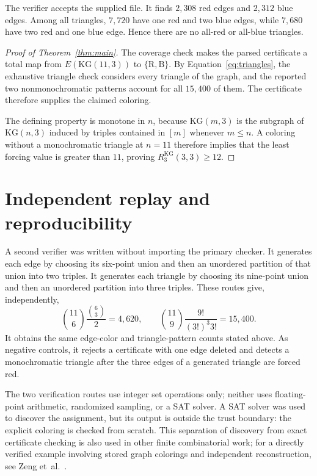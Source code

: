 \documentclass[11pt]{article}
\newcommand{\KG}{\mathrm{KG}}
\newcommand{\KGR}{R^{\mathrm{KG}}_{3}(3,3)}
\begin{document}
The verifier accepts the supplied file.  It finds $2{,}308$ red edges and
$2{,}312$ blue edges.  Among all triangles, $7{,}720$ have one red and two
blue edges, while $7{,}680$ have two red and one blue edge.  Hence there are
no all-red or all-blue triangles.

\begin{proof}[Proof of Theorem~\ref{thm:main}]
The coverage check makes the parsed certificate a total map from
$E(\KG(11,3))$ to $\{\mathrm{R},\mathrm{B}\}$.  By
Equation~\eqref{eq:triangles}, the exhaustive triangle check considers every
triangle of the graph, and the reported two nonmonochromatic patterns
account for all $15{,}400$ of them.  The certificate therefore supplies the
claimed coloring.

The defining property is monotone in $n$, because $\KG(m,3)$ is the
subgraph of $\KG(n,3)$ induced by triples contained in $[m]$ whenever
$m\leq n$.  A coloring without a monochromatic triangle at $n=11$ therefore
implies that the least forcing value is greater than $11$, proving
$\KGR\geq 12$.
\end{proof}

\section{Independent replay and reproducibility}

A second verifier was written without importing the primary checker.  It
generates each edge by choosing its six-point union and then an unordered
partition of that union into two triples.  It generates each triangle by
choosing its nine-point union and then an unordered partition into three
triples.  These routes give, independently,
\[
  \binom{11}{6}\frac{\binom63}{2}=4{,}620,
  \qquad
  \binom{11}{9}\frac{9!}{{(3!)}^3 3!}=15{,}400.
\]
It obtains the same edge-color and triangle-pattern counts stated above.
As negative controls, it rejects a certificate with one edge deleted and
detects a monochromatic triangle after the three edges of a generated
triangle are forced red.

The two verification routes use integer set operations only; neither uses
floating-point arithmetic, randomized sampling, or a SAT solver.  A SAT
solver was used to discover the assignment, but its output is outside the
trust boundary: the explicit coloring is checked from scratch.  This
separation of discovery from exact certificate checking is also used in
other finite combinatorial work; for a directly verified example involving
stored graph colorings and independent reconstruction, see
Zeng et~al.~\cite[Sections 3 and 6]{202608.1658}.
\end{document}
